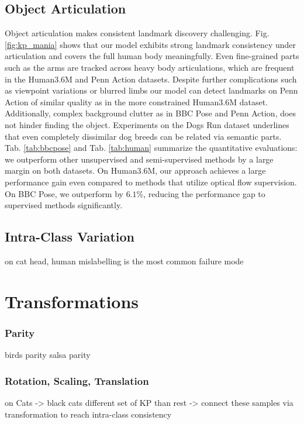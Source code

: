 		\subsection{Object Articulation}
			Object articulation makes consistent landmark discovery challenging.
			Fig. \ref{fig:kp_mania} shows that our model exhibits strong landmark consistency under articulation and covers the full human body meaningfully.
			Even fine-grained parts such as the arms are tracked across heavy body articulations, which are frequent in the Human3.6M and Penn Action datasets.
			Despite further complications such as viewpoint variations or blurred limbs our model can detect landmarks on Penn Action of similar quality as in the more constrained Human3.6M dataset.
			Additionally, complex background clutter as in BBC Pose and Penn Action, does not hinder finding the object.
			Experiments on the Dogs Run dataset underlines that even completely dissimilar dog breeds can be related via semantic parts.
			Tab. \ref{tab:bbcpose} and Tab. \ref{tab:human} summarize the quantitative evaluations: we outperform other unsupervised and semi-supervised methods by a large margin on both datasets.
			On Human3.6M, our approach achieves a large performance gain even compared to methods that utilize optical flow supervision.
			On BBC Pose, we outperform \cite{jakab18} by $6.1\%$, reducing the performance gap to supervised methods significantly.
		\subsection{Intra-Class Variation}
		on cat head, human mislabelling is the most common failure mode

\section{Transformations}\label{sec:transformations}

	\subsubsection{Parity}
	birds parity
	salsa parity

	\subsubsection{Rotation, Scaling, Translation}
		on Cats -> black cats different set of KP than rest -> connect these samples via transformation to reach intra-class consistency

